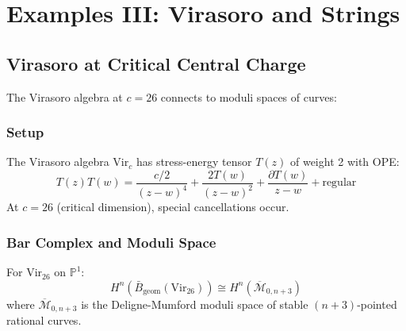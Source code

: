 \section{Examples III: Virasoro and Strings}
 
\subsection{Virasoro at Critical Central Charge}
 
The Virasoro algebra at $c = 26$ connects to moduli spaces of curves:
 
\subsubsection{Setup}
 
\begin{definition}
The Virasoro algebra $\text{Vir}_c$ has stress-energy tensor $T(z)$ of weight 2 with OPE:
\[
T(z)T(w) = \frac{c/2}{(z-w)^4} + \frac{2T(w)}{(z-w)^2} + \frac{\partial T(w)}{z-w} + \text{regular}
\]
At $c = 26$ (critical dimension), special cancellations occur.
\end{definition}
 
\subsubsection{Bar Complex and Moduli Space}
 
\begin{theorem}\label{thm:virasoro-moduli}
For $\text{Vir}_{26}$ on $\mathbb{P}^1$:
\[
H^n(\bar{B}_{\text{geom}}(\text{Vir}_{26})) \cong H^n(\overline{\mathcal{M}}_{0,n+3})
\]
where $\overline{\mathcal{M}}_{0,n+3}$ is the Deligne-Mumford moduli space of stable $(n+3)$-pointed rational curves.
\end{theorem}
 

